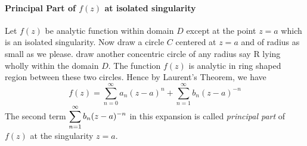  \paragraph{Principal Part of $f(z)$ at isolated singularity}
 Let $f(z)$ be analytic function  within domain $D$ except at the point $z=a$ which is an isolated singularity. Now draw a circle $C$ centered at $z=a$ and of radius as small as we please. draw another concentric circle of any radius say R lying wholly within the domain $D$. The function $f(z)$ is analytic in ring shaped region between these two circles. Hence by Laurent's Theorem, we have
 \[f(z) = \sum_{n=0}^{\infty} a_n (z-a)^n + \sum_{n=1}^{\infty} b_n (z-a)^{-n}\]
 The second term $\displaystyle \sum_{n=1}^{\infty} b_n (z-a)^{-n}$ in this expansion is called \textit{principal part} of $f(z)$ at the singularity $z=a$.
  
